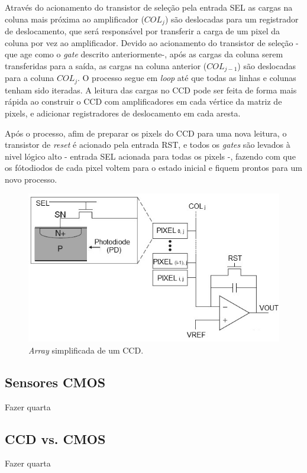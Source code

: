 \documentclass[11pt,a4paper,twocolumn]{article}
\begin{document}
	Através do acionamento do transistor de seleção pela entrada SEL as cargas na coluna mais próxima ao amplificador ($COL_{j}$) são deslocadas para um registrador de deslocamento, que será responsável por transferir a carga de um pixel da coluna por vez ao amplificador. Devido ao acionamento do transistor de seleção - que age como o \textit{gate} descrito anteriormente-, após  as cargas da coluna serem transferidas para a saída, as cargas na coluna anterior ($COL_{j-1}$) são deslocadas para a coluna $COL_{j}$. O processo segue em \textit{loop} até que todas as linhas e colunas tenham sido iteradas. A leitura das cargas no CCD pode ser feita de forma mais rápida ao construir o CCD com amplificadores em cada vértice da matriz de pixels, e adicionar registradores de deslocamento em cada aresta.
	
	Após o processo, afim de preparar os pixels do CCD para uma nova leitura, o transistor de \textit{reset} é acionado pela entrada RST, e todos os \textit{gates} são levados à nivel lógico alto - entrada SEL acionada para todas os pixels -, fazendo com que os fótodiodos de cada pixel voltem para o estado inicial e fiquem prontos para um novo processo.

	\begin{figure}[!h]
		\centering
		\includegraphics[scale=0.56]{imagens/passive-pixel.jpg}
		\caption{\textit{Array} simplificada de um CCD.}
	\end{figure}
	
	\subsection*{Sensores CMOS}
	Fazer quarta
	\subsection*{CCD vs. CMOS}
	Fazer quarta
\end{document}
